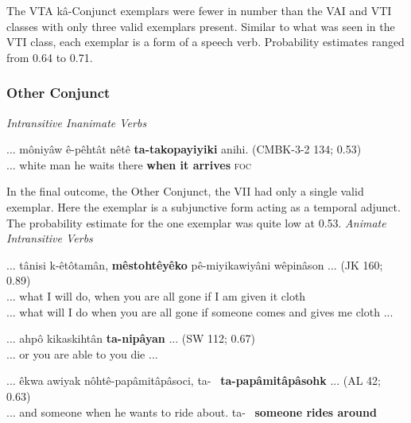 The VTA kâ-Conjunct exemplars were fewer in number than the VAI and VTI classes with only three valid exemplars present. Similar to what was seen in the VTI class, each exemplar is a form of a speech verb. Probability estimates ranged from 0.64 to 0.71.
    


\subsubsection{Other Conjunct}

\textit{Intransitive Inanimate Verbs}

    \begin{exe}
    \ex
    \gll ...  môniyâw ê-pêhtât nêtê \textbf{ta-takopayiyiki} anihi. \tiny{(CMBK-3-2 134; 0.53)} \\
    ... {white man} {he waits} there {\textbf{when it arrives}} \textsc{foc} \\
    \trans 
    \label{ii-othercnjtype1}
    \end{exe}

In the final outcome, the Other Conjunct, the VII had only a single valid exemplar. Here the exemplar is a subjunctive form acting as a temporal adjunct. The probability estimate for the one exemplar was quite low at 0.53.
\vspace{5mm}
\textit{Animate Intransitive Verbs}

    \begin{exe}
    \ex
    \gll ... tânisi k-êtôtamân, \textbf{mêstohtêyêko} pê-miyikawiyâni wêpinâson ... \tiny{(JK 160; 0.89)} \\
    ... what {I will do}, {when you are all gone} {if I am given it} {cloth}\\
    \trans ... what will I do when you are all gone if someone comes and gives me cloth ... \tiny{\citep[132-133]{KaNipitehtew1998}}
    \label{ai-othercnjtype1}
    \end{exe}
    
    \begin{exe}
    \ex
    \gll ... ahpô kikaskihtân \textbf{ta-nipâyan} ... \tiny{(SW 112; 0.67)} \\
    ... or {you are able to} {you die} ...\\
    \trans 
    \label{ai-othercnjtype2}
    \end{exe}
    
    
    \begin{exe}
    \ex
    \gll ... êkwa awiyak nôhtê-papâmitâpâsoci, ta-~ \textbf{ta-papâmitâpâsohk} ... \tiny{(AL 42; 0.63)} \\
    ... and someone {when he wants to ride about}. ta-~ {\textbf{someone rides around}}\\
    \trans 
    \label{ai-othercnjtype3}
    \end{exe}
    
